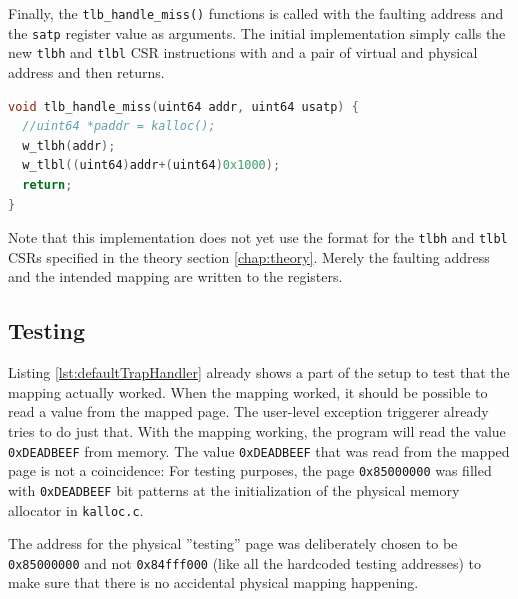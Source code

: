 Finally, the \texttt{tlb\_handle\_miss()} functions is called with the faulting address and the \texttt{satp} register
value as arguments.
The initial implementation simply calls the new \texttt{tlbh} and \texttt{tlbl} CSR instructions with and a pair of virtual and physical address and then
returns.
\begin{lstlisting}[language={C},float=h!,basicstyle=\footnotesize,
    label={lst:defaultTrapHandler}, caption={Simple TLB miss exception handler for a single fixed address}]
void tlb_handle_miss(uint64 addr, uint64 usatp) {
  //uint64 *paddr = kalloc();
  w_tlbh(addr);
  w_tlbl((uint64)addr+(uint64)0x1000);
  return;
}
\end{lstlisting}

Note that this implementation does not yet use the format for the \texttt{tlbh} and \texttt{tlbl} CSRs specified
in the theory section \ref{chap:theory}.
Merely the faulting address and the intended mapping are written to the registers.

\subsection{Testing}
Listing \ref{lst:defaultTrapHandler} already shows a part of the setup to test that the mapping actually worked.
When the mapping worked, it should be possible to read a value from the mapped page.
The user-level exception triggerer already tries to do just that.
With the mapping working, the program will read the value \texttt{0xDEADBEEF} from memory.
The value \texttt{0xDEADBEEF} that was read from the mapped page is not a coincidence:
For testing purposes, the page \texttt{0x85000000} was filled with \texttt{0xDEADBEEF} bit patterns at the initialization of the physical memory allocator in \texttt{kalloc.c}.

The address for the physical ''testing'' page was deliberately chosen to be \texttt{0x85000000} and not
\texttt{0x84fff000} (like all the hardcoded testing addresses) to make sure that there is no accidental physical
mapping happening.






